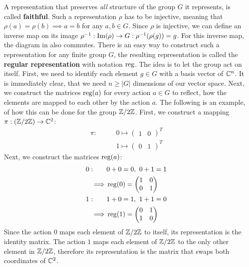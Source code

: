 A representation that preserves \textit{all} structure of the group $G$ it represents, is called \textbf{faithful}.
Such a representation $\rho$ has to be injective, meaning that $\rho(a) = \rho(b) \implies a = b$ for any $a, b \in G$.
Since $\rho$ is injective, we can define an inverse map on its image $\rho^{-1}: \operatorname{Im}(\rho) \to G: \rho^{-1}(\rho(g)) = g$.
For this inverse map, the diagram in  also commutes.
There is an easy way to construct such a representation for any finite group $G$, the resulting representation is called the \textbf{regular representation} with notation $\operatorname{reg}$.
The idea is to let the group act on itself.
First, we need to identify each element $g \in G$ with a basis vector of $\mathbb{C}^n$.
It is immediately clear, that we need $n \geq |G|$ dimensions of our vector space.
Next, we construct the matrices $\operatorname{reg}(a)$ for every action $a \in G$ to reflect, how the elements are mapped to each other by the action $a$.
The following is an example, of how this can be done for the group $\mathbb{Z}/2\mathbb{Z}$.
First, we construct a mapping $\pi: (\mathbb{Z}/2\mathbb{Z}) \to \mathbb{C}^2$:
\begin{align*}
    \pi: \qquad & 0 \mapsto \begin{pmatrix}
        1 & 0
    \end{pmatrix}^T \\
    & 1 \mapsto \begin{pmatrix}
        0 & 1
    \end{pmatrix}^T
\end{align*}
Next, we construct the matrices $\operatorname{reg}(a)$:
\begin{align*}
    0: \qquad & 0 + 0 = 0,\ 0 + 1 = 1 \\
    \implies & \operatorname{reg}(0) = \begin{pmatrix}
        1 & 0 \\
        0 & 1
    \end{pmatrix} \\
    1: \qquad & 1 + 0 = 1,\ 1 + 1 = 0 \\
    \implies & \operatorname{reg}(1) = \begin{pmatrix}
        0 & 1 \\
        1 & 0
    \end{pmatrix}
\end{align*}
Since the action $0$ maps each element of $\mathbb{Z}/2\mathbb{Z}$ to itself, its representation is the identity matrix.
The action $1$ maps each element of $\mathbb{Z}/2\mathbb{Z}$ to the only other element in $\mathbb{Z}/2\mathbb{Z}$, therefore its representation is the matrix that swaps both coordinates of $\mathbb{C}^2$.

